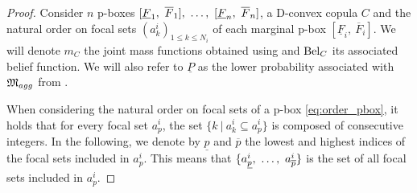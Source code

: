\begin{proof}
    Consider $n$ p-boxes $[\underline{F}_1,~\overline{F}_1] , ~\ldots, ~ [\underline{F}_n,~\overline{F}_n]$, a D-convex copula $C$ and the natural order on focal sets $(a^i_k)_{1\leqslant k \leqslant N_i}$ of each marginal p-box $[\underline{F}_i,~\overline{F}_i]$. We will denote $m_C$ the joint mass functions obtained using  and $\mathrm{Bel}_C$ its associated belief function. We will also refer to $\underline{P}$ as the lower probability associated with $\mathfrak{M}_{agg}$ from .

    When considering the natural order on focal sets of a p-box \eqref{eq:order_pbox}, it holds that for every focal set $a^i_p$, the set $\{k~|~a^i_k\subseteq a^i_p\}$ is composed of consecutive integers. In the following, we denote by $\underline{p}$ and $\overline{p}$ the lowest and highest indices of the focal sets included in $a^i_p$. This means that $\{a^i_{\underline{p}} , ~\ldots, ~ a^i_{\overline{p}}\}$ is the set of all focal sets included in $a^i_p$. 


\end{proof}
